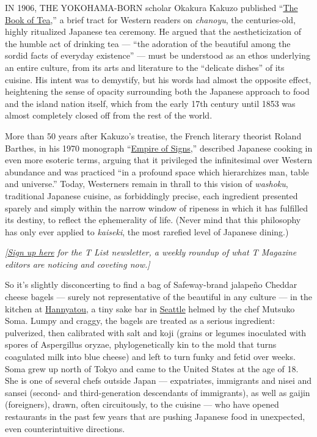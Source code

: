IN 1906, THE YOKOHAMA-BORN scholar Okakura Kakuzo published
``\href{https://www.penguinrandomhouse.com/books/308458/the-book-of-tea-by-kakuzo-okakura/9780141191843/}{The
Book of Tea},'' a brief tract for Western readers on \emph{chanoyu}, the
centuries-old, highly ritualized Japanese tea ceremony. He argued that
the aestheticization of the humble act of drinking tea --- ``the
adoration of the beautiful among the sordid facts of everyday
existence'' --- must be understood as an ethos underlying an entire
culture, from its arts and literature to the ``delicate dishes'' of its
cuisine. His intent was to demystify, but his words had almost the
opposite effect, heightening the sense of opacity surrounding both the
Japanese approach to food and the island nation itself, which from the
early 17th century until 1853 was almost completely closed off from the
rest of the world.

More than 50 years after Kakuzo's treatise, the French literary theorist
Roland Barthes, in his 1970 monograph
``\href{https://us.macmillan.com/books/9780374522070}{Empire of
Signs},'' described Japanese cooking in even more esoteric terms,
arguing that it privileged the infinitesimal over Western abundance and
was practiced ``in a profound space which hierarchizes man, table and
universe.'' Today, Westerners remain in thrall to this vision of
\emph{washoku}, traditional Japanese cuisine, as forbiddingly precise,
each ingredient presented sparely and simply within the narrow window of
ripeness in which it has fulfilled its destiny, to reflect the
ephemerality of life. (Never mind that this philosophy has only ever
applied to \emph{kaiseki}, the most rarefied level of Japanese dining.)

\emph{{[}}\href{https://www.nytimes3xbfgragh.onion/newsletters/t-list?module=inline}{\emph{Sign
up here}} \emph{for the T List newsletter, a weekly roundup of what T
Magazine editors are noticing and coveting now.{]}}

So it's slightly disconcerting to find a bag of Safeway-brand jalapeño
Cheddar cheese bagels --- surely not representative of the beautiful in
any culture --- in the kitchen at
\href{https://www.hannyatou.com/}{Hannyatou}, a tiny sake bar in
\href{https://www.nytimes3xbfgragh.onion/2018/07/05/travel/what-to-do-in-seattle.html}{Seattle}
helmed by the chef Mutsuko Soma. Lumpy and craggy, the bagels are
treated as a serious ingredient: pulverized, then calibrated with salt
and koji (grains or legumes inoculated with spores of Aspergillus
oryzae, phylogenetically kin to the mold that turns coagulated milk into
blue cheese) and left to turn funky and fetid over weeks. Soma grew up
north of Tokyo and came to the United States at the age of 18. She is
one of several chefs outside Japan --- expatriates, immigrants and nisei
and sansei (second- and third-generation descendants of immigrants), as
well as gaijin (foreigners), drawn, often circuitously, to the cuisine
--- who have opened restaurants in the past few years that are pushing
Japanese food in unexpected, even counterintuitive directions.

